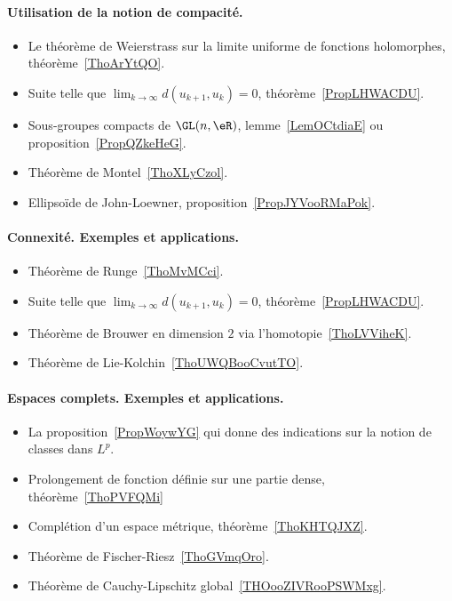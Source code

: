 \paragraph{Utilisation de la notion de compacité.}
\begin{itemize}
    \item Le théorème de Weierstrass sur la limite uniforme de fonctions holomorphes, théorème~\ref{ThoArYtQO}.
    \item Suite telle que \( \lim_{k\to \infty} d(u_{k+1},u_k)=0\), théorème~\ref{PropLHWACDU}.
    \item Sous-groupes compacts de \( \GL(n,\eR)\), lemme~\ref{LemOCtdiaE} ou proposition~\ref{PropQZkeHeG}.
    \item Théorème de Montel~\ref{ThoXLyCzol}.
    \item Ellipsoïde de John-Loewner, proposition~\ref{PropJYVooRMaPok}.
\end{itemize}
\paragraph{Connexité. Exemples et applications.}
\begin{itemize}
    \item Théorème de Runge~\ref{ThoMvMCci}.
    \item Suite telle que \( \lim_{k\to \infty} d(u_{k+1},u_k)=0\), théorème~\ref{PropLHWACDU}.
    \item Théorème de Brouwer en dimension \( 2\) via l'homotopie~\ref{ThoLVViheK}.
    \item Théorème de Lie-Kolchin~\ref{ThoUWQBooCvutTO}.
\end{itemize}
\paragraph{Espaces complets. Exemples et applications.}
\begin{itemize}
    \item La proposition~\ref{PropWoywYG} qui donne des indications sur la notion de classes dans \( L^p\).
    \item Prolongement de fonction définie sur une partie dense, théorème~\ref{ThoPVFQMi}
    \item Complétion d'un espace métrique, théorème~\ref{ThoKHTQJXZ}.
    \item Théorème de Fischer-Riesz~\ref{ThoGVmqOro}.
    \item Théorème de Cauchy-Lipschitz global~\ref{THOooZIVRooPSWMxg}.
\end{itemize}
